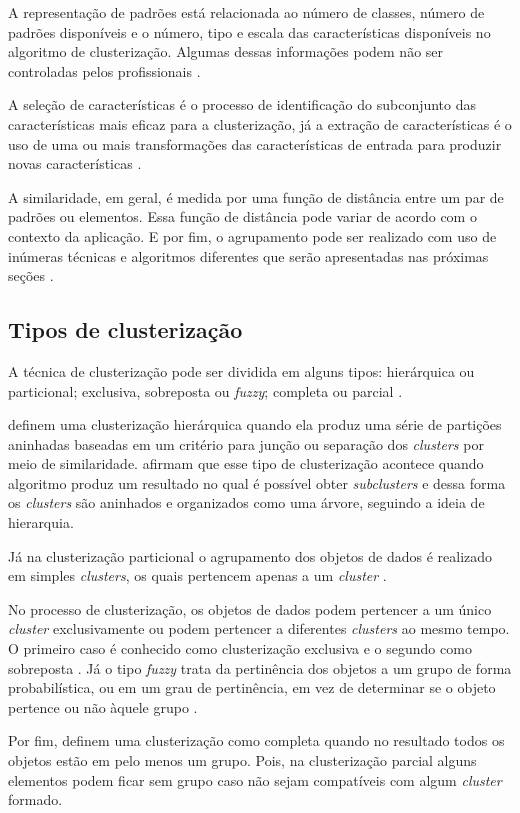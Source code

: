 A representação de padrões está relacionada ao número de classes, número de padrões disponíveis e o número, tipo e escala
das características disponíveis no algoritmo de clusterização. Algumas dessas informações podem não ser controladas pelos
profissionais \cite{clustering_review}.

A seleção de características é o processo de identificação do subconjunto das características mais eficaz para a clusterização, já a extração
de características é o uso de uma ou mais transformações das características de entrada para produzir novas características \cite{clustering_review}.

A similaridade, em geral, é medida por uma função de distância entre um par de padrões ou elementos. Essa função de distância pode variar de acordo com o contexto da aplicação. E por fim, o agrupamento pode ser realizado com uso de inúmeras técnicas e algoritmos diferentes que serão apresentadas nas próximas seções \cite{clustering_review}.

\subsection{Tipos de clusterização}

A técnica de clusterização pode ser dividida em alguns tipos: hierárquica ou particional; exclusiva, sobreposta ou \textit{fuzzy}; completa ou parcial \cite{tan2013data, clustering_review}. 

 definem uma clusterização hierárquica quando ela produz uma série
de partições aninhadas baseadas em um critério para junção ou separação dos \textit{clusters} por meio de similaridade.  afirmam que esse tipo de clusterização acontece quando algoritmo
produz um resultado no qual é possível obter \textit{subclusters} e dessa forma os \textit{clusters} são aninhados
e organizados como uma árvore, seguindo a ideia de hierarquia.

Já na clusterização particional o agrupamento dos objetos de dados é realizado em simples \textit{clusters}, os quais pertencem apenas a um \textit{cluster} \cite{tan2013data}.

No processo de clusterização, os objetos de dados podem pertencer a um único \textit{cluster} exclusivamente ou podem
pertencer a diferentes \textit{clusters} ao mesmo tempo. O primeiro caso é conhecido como clusterização exclusiva e o segundo como sobreposta \cite{tan2013data}. Já o tipo \textit{fuzzy} trata da pertinência dos objetos a um grupo de forma probabilística, ou em um grau de pertinência, em vez de determinar se o objeto pertence ou não àquele grupo \cite{tan2013data, clustering_review}.

Por fim,  definem uma clusterização como completa quando no resultado todos os objetos estão em pelo menos um grupo. Pois, na clusterização parcial alguns elementos podem ficar sem grupo caso não sejam compatíveis com algum \textit{cluster} formado.

